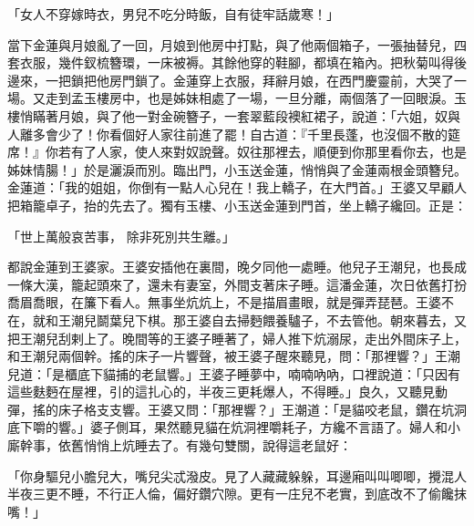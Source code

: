 \begin{showcontents}{}
「女人不穿嫁時衣，男兒不吃分時飯，自有徒牢話歲寒！」

當下金蓮與月娘亂了一回，月娘到他房中打點，與了他兩個箱子，一張抽替兒，四套衣服，幾件釵梳簪環，一床被褥。其餘他穿的鞋腳，都填在箱內。把秋菊叫得後邊來，一把鎖把他房門鎖了。金蓮穿上衣服，拜辭月娘，在西門慶靈前，大哭了一場。又走到孟玉樓房中，也是姊妹相處了一場，一旦分離，兩個落了一回眼淚。玉樓悄瞞著月娘，與了他一對金碗簪子，一套翠藍段襖紅裙子，說道：「六姐，奴與人離多會少了！你看個好人家往前進了罷！自古道：『千里長蓬，也沒個不散的筵席！』你若有了人家，使人來對奴說聲。奴往那裡去，順便到你那里看你去，也是姊妹情腸！」於是灑淚而別。臨出門，小玉送金蓮，悄悄與了金蓮兩根金頭簪兒。金蓮道：「我的姐姐，你倒有一點人心兒在！我上轎子，在大門首。」王婆又早顧人把箱籠卓子，抬的先去了。獨有玉樓、小玉送金蓮到門首，坐上轎子纔回。正是：

「世上萬般哀苦事，  除非死別共生離。」

都說金蓮到王婆家。王婆安插他在裏間，晚夕同他一處睡。他兒子王潮兒，也長成一條大漢，籠起頭來了，還未有妻室，外間支著床子睡。這潘金蓮，次日依舊打扮喬眉喬眼，在簾下看人。無事坐炕炕上，不是描眉畫眼，就是彈弄琵琶。王婆不在，就和王潮兒鬬葉兒下棋。那王婆自去掃麪餵養驢子，不去管他。朝來暮去，又把王潮兒刮剌上了。晚間等的王婆子睡著了，婦人推下炕溺尿，走出外間床子上，和王潮兒兩個幹。搖的床子一片響聲，被王婆子醒來聽見，問：「那裡響？」王潮兒道：「是櫃底下貓捕的老鼠響。」王婆子睡夢中，喃喃吶吶，口裡說道：「只因有這些麩麪在屋裡，引的這扎心的，半夜三更耗爆人，不得睡。」良久，又聽見動彈，搖的床子格支支響。王婆又問：「那裡響？」王潮道：「是貓咬老鼠，鑽在坑洞底下嚼的響。」婆子側耳，果然聽見貓在炕洞裡嚼耗子，方纔不言語了。婦人和小廝幹事，依舊悄悄上炕睡去了。有幾句雙關，說得這老鼠好：

「你身驅兒小膽兒大，嘴兒尖忒潑皮。見了人藏藏躲躲，耳邊廂叫叫唧唧，攪混人半夜三更不睡，不行正人倫，偏好鑽穴隙。更有一庄兒不老實，到底改不了偷饞抹嘴！」


\end{showcontents}

